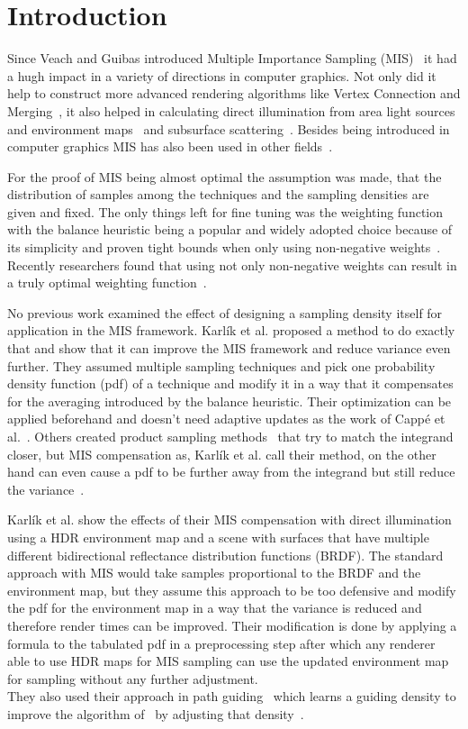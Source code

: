\chapter{Introduction}
\label{ch:introduction}
Since Veach and Guibas introduced Multiple Importance Sampling (MIS)~\cite{veach_guibas}
it had a hugh impact in a variety of directions in computer graphics.
Not only did it help to construct more advanced rendering algorithms like Vertex Connection and Merging~\cite{vcm},
it also helped in calculating direct illumination from area light sources and environment maps~\cite[Chapter~14.3]{pbr-book}
and subsurface scattering~\cite{King}.
Besides being introduced in computer graphics MIS has also been used in other fields~\cite{he}.

For the proof of MIS being almost optimal the assumption was made,
that the distribution of samples among the techniques and the sampling densities are given and fixed.
The only things left for fine tuning was the weighting function
with the balance heuristic being a popular and widely adopted choice because of its simplicity
and proven tight bounds when only using non-negative weights~\cite[Theorem~9.2]{veach-thesis}.
Recently researchers found that using not only non-negative weights can result in a truly optimal weighting function~\cite{Kondapaneni2019}.

No previous work examined the effect of designing a sampling density itself for application in the MIS framework.
Karl\'ik et al. proposed a method to do exactly that and show that it can improve the MIS framework and reduce variance even further.
They assumed multiple sampling techniques and pick one probability density function (pdf) of a technique and modify it in a way that it compensates for the averaging introduced by the balance heuristic.
Their optimization can be applied beforehand and doesn't need adaptive updates as the work of Capp\'e et al.~\cite{Cappe2008}.
Others created product sampling methods~\cite{Herholz} that try to match the integrand closer,
but MIS compensation as, Karl\'ik et al. call their method,
on the other hand can even cause a pdf to be further away from the integrand but still reduce the variance~\cite{Karlik2019}.

Karl\'ik et al. show the effects of their MIS compensation with direct illumination using a HDR environment map
and a scene with surfaces that have multiple different bidirectional reflectance distribution functions (BRDF).
The standard approach with MIS would take samples proportional to the BRDF and the environment map,
but they assume this approach to be too defensive and modify the pdf for the environment map in a way that the variance is reduced
and therefore render times can be improved.
Their modification is done by applying a formula to the tabulated pdf in a preprocessing step
after which any renderer able to use HDR maps for MIS sampling can use the updated environment map for sampling without any further adjustment.\\
They also used their approach in path guiding~\cite{Vorba_2019} which learns a guiding density to improve the algorithm of~\cite{mueller2017} by adjusting that density~\cite{Karlik2019}.